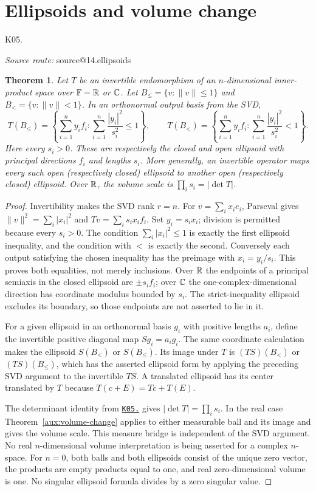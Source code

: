 \documentclass[11pt,a4paper]{book}
\makeatletter
\newtheorem{theorem}{Theorem}[chapter]
\theoremstyle{definition}\newtheorem{definition}[theorem]{Definition}
\theoremstyle{remark}\newtheorem{remark}[theorem]{Remark}
\newcommand{\norm}[1]{\lVert #1\rVert}
\newcommand{\kref}[1]{\hyperref[k:#1]{\texttt{K05.\detokenize{#1}}}}
\newcommand{\Kentry}[2]{\section{#2}\label{k:#1}\noindent\textsf{\small K05.\detokenize{#1}}\par
  \begingroup\small\color{black!65}\textit{Source route: }\csname source@#1\endcsname\par\endgroup}
\makeatother
\begin{document}
\Kentry{14.ellipsoids}{Ellipsoids and volume change}
\begin{theorem}
Let $T$ be an invertible endomorphism of an $n$-dimensional inner-product space over $\mathbb F=\mathbb R$ or $\mathbb C$. Let $B_{\le} =\{v:\norm v\le1\}$ and $B_{<}=\{v:\norm v<1\}$. In an orthonormal output basis from the SVD,
\[
T(B_{\le})=\left\{\sum_{i=1}^n y_if_i:
                 \sum_{i=1}^n\frac{|y_i|^2}{s_i^2}\le1\right\},
\qquad
T(B_{<})=\left\{\sum_{i=1}^n y_if_i:
                 \sum_{i=1}^n\frac{|y_i|^2}{s_i^2}<1\right\}.
\]
Here every $s_i>0$. These are respectively the closed and open ellipsoid with principal directions $f_i$ and lengths $s_i$. More generally, an invertible operator maps every such open (respectively closed) ellipsoid to another open (respectively closed) ellipsoid. Over $\mathbb R$, the volume scale is $\prod_i s_i=|\det T|$.
\end{theorem}
\begin{proof}
Invertibility makes the SVD rank $r=n$. For $v=\sum_i x_i e_i$, Parseval gives $\norm v^2=\sum_i|x_i|^2$ and $Tv=\sum_i s_i x_i f_i$. Set $y_i=s_i x_i$; division is permitted because every $s_i>0$. The condition $\sum_i|x_i|^2\le1$ is exactly the first ellipsoid inequality, and the condition with $<$ is exactly the second. Conversely each output satisfying the chosen inequality has the preimage with $x_i=y_i/s_i$. This proves both equalities, not merely inclusions. Over $\mathbb R$ the endpoints of a principal semiaxis in the closed ellipsoid are $\pm s_i f_i$; over $\mathbb C$ the one-complex-dimensional direction has coordinate modulus bounded by $s_i$. The strict-inequality ellipsoid excludes its boundary, so those endpoints are not asserted to lie in it.

For a given ellipsoid in an orthonormal basis $g_i$ with positive lengths $a_i$, define the invertible positive diagonal map $Sg_i=a_i g_i$. The same coordinate calculation makes the ellipsoid $S(B_{<})$ or $S(B_{\le})$. Its image under $T$ is $(TS)(B_{<})$ or $(TS)(B_{\le})$, which has the asserted ellipsoid form by applying the preceding SVD argument to the invertible $TS$. A translated ellipsoid has its center translated by $T$ because $T(c+E)=Tc+T(E)$.

The determinant identity from \kref{14.svd} gives $|\det T|=\prod_i s_i$. In the real case Theorem~\ref{aux:volume-change} applies to either measurable ball and its image and gives the volume scale. This measure bridge is independent of the SVD argument. No real $n$-dimensional volume interpretation is being asserted for a complex $n$-space. For $n=0$, both balls and both ellipsoids consist of the unique zero vector, the products are empty products equal to one, and real zero-dimensional volume is one. No singular ellipsoid formula divides by a zero singular value.
\end{proof}
\end{document}
